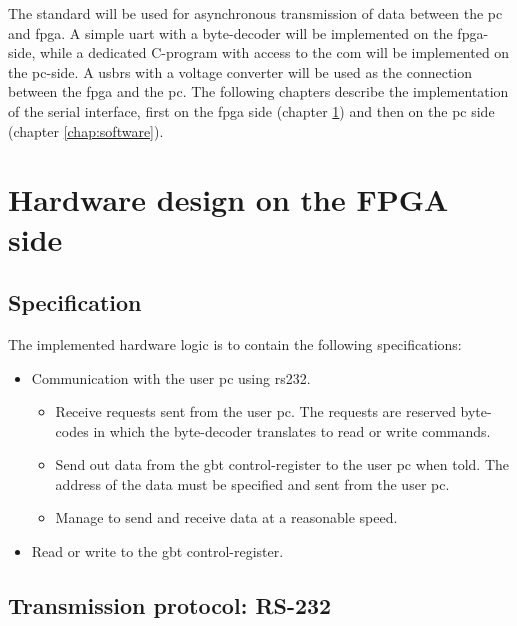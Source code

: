 \documentclass[main.tex]{subfiles}
\begin{document}
The standard will be used for asynchronous transmission of data between the \acrshort{pc} and \gls{fpga}. A simple \gls{uart} with a byte-decoder will be implemented on the \gls{fpga}-side, while a dedicated C-program with access to the \gls{com} will be implemented on the \acrshort{pc}-side. A \gls{usbrs} with a voltage converter will be used as the connection between the \gls{fpga} and the \acrshort{pc}. The following chapters describe the implementation of the serial interface, first on the \gls{fpga} side (chapter \ref{chap:hardware}) and then on the \gls{pc} side (chapter \ref{chap:software}).



\chapter{Hardware design on the FPGA side} \label{chap:hardware}

\section{Specification}

The implemented hardware logic is to contain the following specifications:\\
\begin{itemize} \setlength{\itemsep}{10pt}
\item Communication with the user \acrshort{pc} using \acrshort{rs232}.
  \begin{itemize}
  \item Receive requests sent from the user \acrshort{pc}. The requests are reserved byte-codes in which the byte-decoder translates to read or write commands. 
  \item Send out data from the \gls{gbt} control-register to the user \acrshort{pc} when told. The address of the data must be specified and sent from the user \acrshort{pc}.
  \item Manage to send and receive data at a reasonable speed. 
  \end{itemize}
\item Read or write to the \gls{gbt} control-register.
\end{itemize}

\section{Transmission protocol: RS-232}
\end{document}
